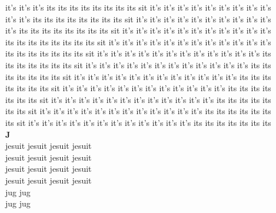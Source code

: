 it's it's it's its its its its its its its its sit it's it's it's it's it's it's it's it's it's\\
it's it's its its its its its its its its sit it's it's it's it's it's it's it's it's it's it's\\
it's its its its its its its its its sit it's it's it's it's it's it's it's it's it's it's it's\\
its its its its its its its its sit it's it's it's it's it's it's it's it's it's it's it's it's\\
its its its its its its its sit it's it's it's it's it's it's it's it's it's it's it's it's its\\
its its its its its its sit it's it's it's it's it's it's it's it's it's it's it's it's its its\\
its its its its its sit it's it's it's it's it's it's it's it's it's it's it's it's its its its\\
its its its its sit it's it's it's it's it's it's it's it's it's it's it's it's its its its its\\
its its its sit it's it's it's it's it's it's it's it's it's it's it's it's its its its its its\\
its its sit it's it's it's it's it's it's it's it's it's it's it's it's its its its its its its\\
its sit it's it's it's it's it's it's it's it's it's it's it's it's its its its its its its its\\


\vspace{14pt}
\noindent\textbf{\Large J}\\[+12pt]
jesuit jesuit jesuit jesuit\\
jesuit jesuit jesuit jesuit\\
jesuit jesuit jesuit jesuit\\
jesuit jesuit jesuit jesuit\\
jug jug\\
jug jug\\



